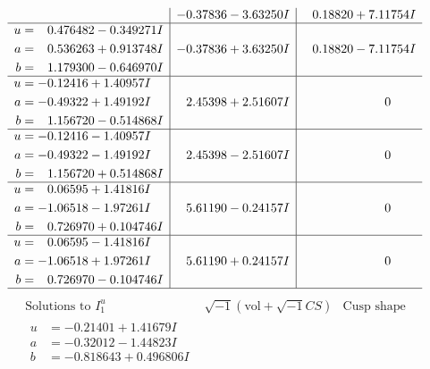 \documentclass[1p]{elsarticle_modified}
\theoremstyle{definition}
\newcommand{\I}{\sqrt{-1}}
\begin{document}
$$\begin{array}{c|c|c}
 & -0.37836 - 3.63250 I & \phantom{-}0.18820 + 7.11754 I \\ \hline\begin{aligned}
u &= \phantom{-}0.476482 - 0.349271 I \\
a &= \phantom{-}0.536263 + 0.913748 I \\
b &= \phantom{-}1.179300 - 0.646970 I\end{aligned}
 & -0.37836 + 3.63250 I & \phantom{-}0.18820 - 7.11754 I \\ \hline\begin{aligned}
u &= -0.12416 + 1.40957 I \\
a &= -0.49322 + 1.49192 I \\
b &= \phantom{-}1.156720 - 0.514868 I\end{aligned}
 & \phantom{-}2.45398 + 2.51607 I & \phantom{-0.000000 } 0 \\ \hline\begin{aligned}
u &= -0.12416 - 1.40957 I \\
a &= -0.49322 - 1.49192 I \\
b &= \phantom{-}1.156720 + 0.514868 I\end{aligned}
 & \phantom{-}2.45398 - 2.51607 I & \phantom{-0.000000 } 0 \\ \hline\begin{aligned}
u &= \phantom{-}0.06595 + 1.41816 I \\
a &= -1.06518 - 1.97261 I \\
b &= \phantom{-}0.726970 + 0.104746 I\end{aligned}
 & \phantom{-}5.61190 - 0.24157 I & \phantom{-0.000000 } 0 \\ \hline\begin{aligned}
u &= \phantom{-}0.06595 - 1.41816 I \\
a &= -1.06518 + 1.97261 I \\
b &= \phantom{-}0.726970 - 0.104746 I\end{aligned}
 & \phantom{-}5.61190 + 0.24157 I & \phantom{-0.000000 } 0\\
 \hline 
 \end{array}$$\newpage$$\begin{array}{c|c|c}  
\text{Solutions to }I^u_{1}& \I (\text{vol} + \sqrt{-1}CS) & \text{Cusp shape}\\
 \hline 
\begin{aligned}
u &= -0.21401 + 1.41679 I \\
a &= -0.32012 - 1.44823 I \\
b &= -0.818643 + 0.496806 I\end{aligned}

\end{array}$$
\end{document}
